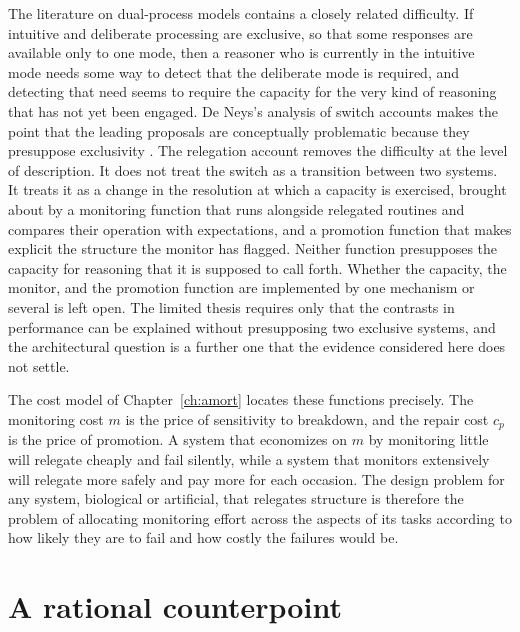 \documentclass[11pt]{report}
\theoremstyle{remark}
\theoremstyle{definition}
\begin{document}
The literature on dual-process models contains a closely related difficulty. If intuitive and deliberate processing are exclusive, so that some responses are available only to one mode, then a reasoner who is currently in the intuitive mode needs some way to detect that the deliberate mode is required, and detecting that need seems to require the capacity for the very kind of reasoning that has not yet been engaged. De Neys's analysis of switch accounts makes the point that the leading proposals are conceptually problematic because they presuppose exclusivity \cite{deneys2023}. The relegation account removes the difficulty at the level of description. It does not treat the switch as a transition between two systems. It treats it as a change in the resolution at which a capacity is exercised, brought about by a monitoring function that runs alongside relegated routines and compares their operation with expectations, and a promotion function that makes explicit the structure the monitor has flagged. Neither function presupposes the capacity for reasoning that it is supposed to call forth. Whether the capacity, the monitor, and the promotion function are implemented by one mechanism or several is left open. The limited thesis requires only that the contrasts in performance can be explained without presupposing two exclusive systems, and the architectural question is a further one that the evidence considered here does not settle.

The cost model of Chapter~\ref{ch:amort} locates these functions precisely. The monitoring cost $m$ is the price of sensitivity to breakdown, and the repair cost $c_p$ is the price of promotion. A system that economizes on $m$ by monitoring little will relegate cheaply and fail silently, while a system that monitors extensively will relegate more safely and pay more for each occasion. The design problem for any system, biological or artificial, that relegates structure is therefore the problem of allocating monitoring effort across the aspects of its tasks according to how likely they are to fail and how costly the failures would be.

\section{A rational counterpoint}
\end{document}
